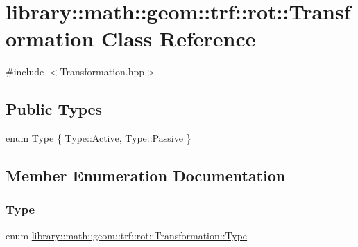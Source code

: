 \hypertarget{classlibrary_1_1math_1_1geom_1_1trf_1_1rot_1_1_transformation}{}\section{library\+:\+:math\+:\+:geom\+:\+:trf\+:\+:rot\+:\+:Transformation Class Reference}
\label{classlibrary_1_1math_1_1geom_1_1trf_1_1rot_1_1_transformation}


{\ttfamily \#include $<$Transformation.\+hpp$>$}

\subsection*{Public Types}
\begin{DoxyCompactItemize}
\item 
enum \hyperlink{classlibrary_1_1math_1_1geom_1_1trf_1_1rot_1_1_transformation_a67f77f4eb87098e589562cc4b4e46be4}{Type} \{ \hyperlink{classlibrary_1_1math_1_1geom_1_1trf_1_1rot_1_1_transformation_a67f77f4eb87098e589562cc4b4e46be4a4d3d769b812b6faa6b76e1a8abaece2d}{Type\+::\+Active}, 
\hyperlink{classlibrary_1_1math_1_1geom_1_1trf_1_1rot_1_1_transformation_a67f77f4eb87098e589562cc4b4e46be4af80bc338b6146b566004a046f8137c85}{Type\+::\+Passive}
 \}
\end{DoxyCompactItemize}


\subsection{Member Enumeration Documentation}
\mbox{\label{classlibrary_1_1math_1_1geom_1_1trf_1_1rot_1_1_transformation_a67f77f4eb87098e589562cc4b4e46be4}} 
\subsubsection{\texorpdfstring{Type}{Type}}
{\footnotesize\ttfamily enum \hyperlink{classlibrary_1_1math_1_1geom_1_1trf_1_1rot_1_1_transformation_a67f77f4eb87098e589562cc4b4e46be4}{library\+::math\+::geom\+::trf\+::rot\+::\+Transformation\+::\+Type}\hspace{0.3cm}{\ttfamily [strong]}}

